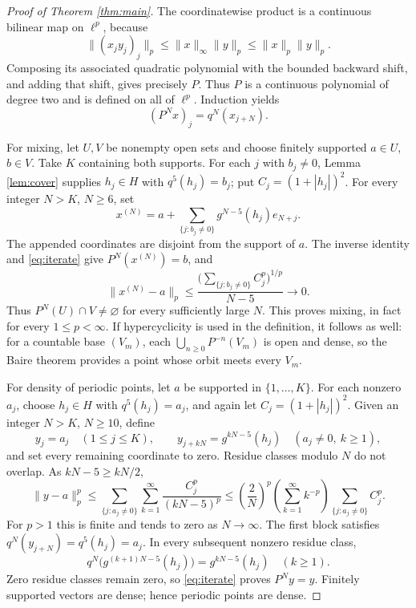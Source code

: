\documentclass[11pt]{article}
\begin{document}
\begin{proof}[Proof of Theorem \ref{thm:main}]
The coordinatewise product is a continuous bilinear map on \(\ell^p\),
because
\[
 \|(x_jy_j)_j\|_p\le\|x\|_\infty\|y\|_p
                    \le\|x\|_p\|y\|_p.
\]
Composing its associated quadratic polynomial with the bounded backward
shift, and adding that shift, gives precisely \(P\). Thus \(P\) is a
continuous polynomial of degree two and is defined on all of \(\ell^p\).
Induction yields
\begin{equation}\label{eq:iterate}
 (P^N x)_j=q^N(x_{j+N}).
\end{equation}

For mixing, let \(U,V\) be nonempty open sets and choose finitely
supported \(a\in U\), \(b\in V\). Take \(K\) containing both supports.
For each \(j\) with \(b_j\ne0\), Lemma \ref{lem:cover} supplies \(h_j\in H\)
with \(q^5(h_j)=b_j\); put \(C_j=(1+|h_j|)^2\).
For every integer \(N>K\), \(N\ge6\), set
\[
 x^{(N)}=a+\sum_{\{j:b_j\ne0\}}g^{N-5}(h_j)e_{N+j}.
\]
The appended coordinates are disjoint from the support of \(a\).
The inverse identity and \eqref{eq:iterate} give
\(P^N(x^{(N)})=b\), and
\[
 \|x^{(N)}-a\|_p
 \le \frac{\bigl(\sum_{\{j:b_j\ne0\}}C_j^p\bigr)^{1/p}}{N-5}
 \longrightarrow0.
\]
Thus \(P^N(U)\cap V\ne\varnothing\) for every sufficiently large \(N\).
This proves mixing, in fact for every \(1\le p<\infty\).
If hypercyclicity is used in the definition, it follows as well:
for a countable base \((V_m)\), each
\(\bigcup_{n\ge0}P^{-n}(V_m)\) is open and dense, so the Baire theorem
provides a point whose orbit meets every \(V_m\).

For density of periodic points, let \(a\) be supported in
\(\{1,\ldots,K\}\). For each nonzero \(a_j\), choose \(h_j\in H\) with
\(q^5(h_j)=a_j\), and again let \(C_j=(1+|h_j|)^2\).
Given an integer \(N>K\), \(N\ge10\), define
\[
 y_j=a_j\quad(1\le j\le K),\qquad
 y_{j+kN}=g^{kN-5}(h_j)
       \quad(a_j\ne0,\ k\ge1),
\]
and set every remaining coordinate to zero. Residue classes modulo \(N\)
do not overlap. As \(kN-5\ge kN/2\),
\begin{equation}\label{eq:tail}
 \|y-a\|_p^p
 \le \sum_{\{j:a_j\ne0\}}\sum_{k=1}^\infty
                    \frac{C_j^p}{(kN-5)^p}
 \le \left(\frac2N\right)^p
       \left(\sum_{k=1}^\infty k^{-p}\right)
       \sum_{\{j:a_j\ne0\}}C_j^p.
\end{equation}
For \(p>1\) this is finite and tends to zero as \(N\to\infty\).
The first block satisfies \(q^N(y_{j+N})=q^5(h_j)=a_j\).
In every subsequent nonzero residue class,
\[
 q^N\bigl(g^{(k+1)N-5}(h_j)\bigr)=g^{kN-5}(h_j)\quad(k\ge1).
\]
Zero residue classes remain zero, so \eqref{eq:iterate} proves \(P^N y=y\).
Finitely supported vectors are dense; hence periodic points are dense.


\end{proof}
\end{document}
